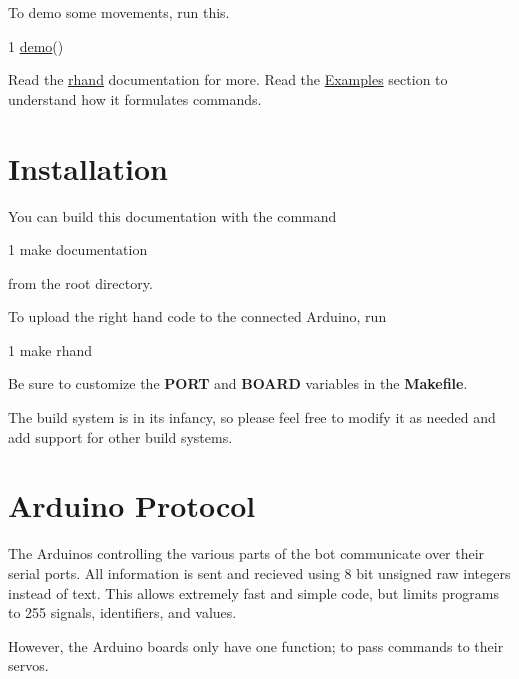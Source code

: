 To demo some movements, run this. 
\begin{DoxyCode}
1 \hyperlink{namespacerhand_ab61f76a347c39c86870720263e1ffbdc}{demo}()
\end{DoxyCode}


Read the \hyperlink{namespacerhand}{rhand} documentation for more. Read the \hyperlink{index_Examples}{Examples} section to understand how it formulates commands.\hypertarget{index_Installation}{}\section{Installation}\label{index_Installation}
You can build this documentation with the command 
\begin{DoxyCode}
1 make documentation
\end{DoxyCode}
 from the root directory.

To upload the right hand code to the connected Arduino, run 
\begin{DoxyCode}
1 make rhand
\end{DoxyCode}
 Be sure to customize the {\bfseries P\+O\+R\+T} and {\bfseries B\+O\+A\+R\+D} variables in the {\bfseries Makefile}.

The build system is in its infancy, so please feel free to modify it as needed and add support for other build systems.\hypertarget{index_Arduino}{}\section{Arduino Protocol}\label{index_Arduino}
The Arduinos controlling the various parts of the bot communicate over their serial ports. All information is sent and recieved using 8 bit unsigned raw integers instead of text. This allows extremely fast and simple code, but limits programs to 255 signals, identifiers, and values.

However, the Arduino boards only have one function; to pass commands to their servos.

